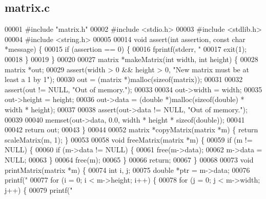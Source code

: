 \subsection{matrix.\+c}
\label{a00125_source}

\begin{DoxyCode}
00001 \textcolor{preprocessor}{#include "matrix.h"}
00002 \textcolor{preprocessor}{#include <stdio.h>}
00003 \textcolor{preprocessor}{#include <stdlib.h>}
00004 \textcolor{preprocessor}{#include <string.h>}
00005 
00014 \textcolor{keywordtype}{void} assert(\textcolor{keywordtype}{int} assertion, \textcolor{keyword}{const} \textcolor{keywordtype}{char} *message) \{
00015   \textcolor{keywordflow}{if} (assertion == 0) \{
00016     fprintf(stderr, \textcolor{stringliteral}{"%
00017     exit(1);
00018   \}
00019 \}
00020 
00027 matrix *makeMatrix(\textcolor{keywordtype}{int} width, \textcolor{keywordtype}{int} height) \{
00028   matrix *out;
00029   assert(width > 0 && height > 0, \textcolor{stringliteral}{"New matrix must be at least a 1 by 1"});
00030   out = (matrix *)malloc(\textcolor{keyword}{sizeof}(matrix));
00031 
00032   assert(out != NULL, \textcolor{stringliteral}{"Out of memory."});
00033 
00034   out->width = width;
00035   out->height = height;
00036   out->data = (\textcolor{keywordtype}{double} *)malloc(\textcolor{keyword}{sizeof}(\textcolor{keywordtype}{double}) * width * height);
00037 
00038   assert(out->data != NULL, \textcolor{stringliteral}{"Out of memory."});
00039 
00040   memset(out->data, 0.0, width * height * \textcolor{keyword}{sizeof}(\textcolor{keywordtype}{double}));
00041 
00042   \textcolor{keywordflow}{return} out;
00043 \}
00044 
00052 matrix *copyMatrix(matrix *m) \{ \textcolor{keywordflow}{return} scaleMatrix(m, 1); \}
00053 
00058 \textcolor{keywordtype}{void} freeMatrix(matrix *m) \{
00059   \textcolor{keywordflow}{if} (m != NULL) \{
00060     \textcolor{keywordflow}{if} (m->data != NULL) \{
00061       free(m->data);
00062       m->data = NULL;
00063     \}
00064     free(m);
00065   \}
00066   \textcolor{keywordflow}{return};
00067 \}
00068 
00073 \textcolor{keywordtype}{void} printMatrix(matrix *m) \{
00074   \textcolor{keywordtype}{int} i, j;
00075   \textcolor{keywordtype}{double} *ptr = m->data;
00076   printf(\textcolor{stringliteral}{"%
00077   \textcolor{keywordflow}{for} (i = 0; i < m->height; i++) \{
00078     \textcolor{keywordflow}{for} (j = 0; j < m->width; j++) \{
00079       printf(\textcolor{stringliteral}{" %
}}}
\end{DoxyCode}
